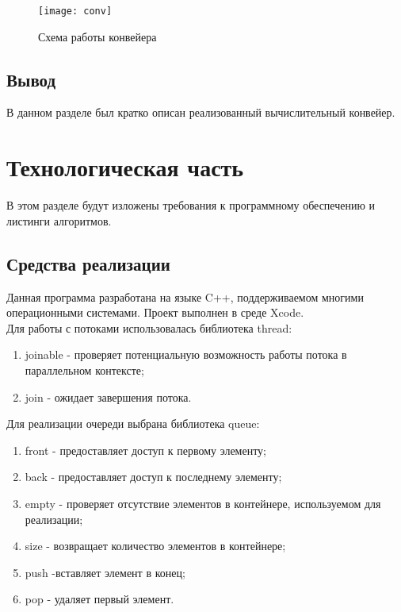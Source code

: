 \documentclass[a4paper, 14pt]{article}
\begin{document}
	\begin{figure}[H]
        	\begin{center}
        		{\texttt{[image: conv]}}
        		\caption{Схема работы конвейера}
        	\end{center}
        \end{figure}

	\subsection{Вывод}
	
	В данном разделе был кратко описан реализованный вычислительный конвейер.

	\newpage
	\section{Технологическая часть}
	
	В этом разделе будут изложены требования к программному обеспечению и листинги алгоритмов.
	
	\subsection{Средства реализации}
	
		Данная программа разработана на языке C++, поддерживаемом многими операционными системами. Проект выполнен в среде Xcode. \\
		
		Для работы с потоками использовалась библиотека thread:
		
\begin{enumerate}
	\item joinable - проверяет потенциальную возможность работы потока в параллельном контексте;
	\item join - ожидает завершения потока.
\end{enumerate}
		
		Для реализации очереди выбрана библиотека queue:
		
\begin{enumerate}
	\item front - предоставляет доступ к первому элементу;
	\item back - предоставляет доступ к последнему элементу;
	\item empty - проверяет отсутствие элементов в контейнере, используемом для реализации;
	\item size - возвращает количество элементов в контейнере;
	\item push -вставляет элемент в конец;
	\item pop - удаляет первый элемент.
\end{enumerate}
		
\end{document}
